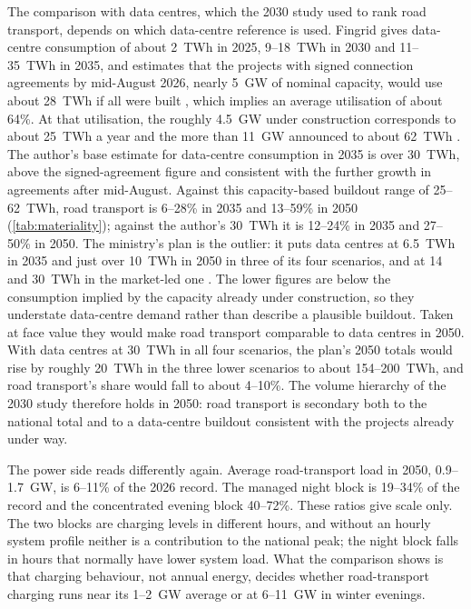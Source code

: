 \documentclass[11pt,a4paper]{article}
\begin{document}
The comparison with data centres, which the 2030 study used to rank road transport, depends on which data-centre reference is used. Fingrid gives data-centre consumption of about 2~TWh in 2025, 9--18~TWh in 2030 and 11--35~TWh in 2035, and estimates that the projects with signed connection agreements by mid-August 2026, nearly 5~GW of nominal capacity, would use about 28~TWh if all were built \citep{fingrid2026prospects}, which implies an average utilisation of about 64\%. At that utilisation, the roughly 4.5~GW under construction corresponds to about 25~TWh a year and the more than 11~GW announced to about 62~TWh \citep{merilehto2026blog}. The author's base estimate for data-centre consumption in 2035 is over 30~TWh, above the signed-agreement figure and consistent with the further growth in agreements after mid-August. Against this capacity-based buildout range of 25--62~TWh, road transport is 6--28\% in 2035 and 13--59\% in 2050 (\cref{tab:materiality}); against the author's 30~TWh it is 12--24\% in 2035 and 27--50\% in 2050. The ministry's plan is the outlier: it puts data centres at 6.5~TWh in 2035 and just over 10~TWh in 2050 in three of its four scenarios, and at 14 and 30~TWh in the market-led one \citep{meae2026ltcp}. The lower figures are below the consumption implied by the capacity already under construction, so they understate data-centre demand rather than describe a plausible buildout. Taken at face value they would make road transport comparable to data centres in 2050. With data centres at 30~TWh in all four scenarios, the plan's 2050 totals would rise by roughly 20~TWh in the three lower scenarios to about 154--200~TWh, and road transport's share would fall to about 4--10\%. The volume hierarchy of the 2030 study therefore holds in 2050: road transport is secondary both to the national total and to a data-centre buildout consistent with the projects already under way.

The power side reads differently again. Average road-transport load in 2050, 0.9--1.7~GW, is 6--11\% of the 2026 record. The managed night block is 19--34\% of the record and the concentrated evening block 40--72\%. These ratios give scale only. The two blocks are charging levels in different hours, and without an hourly system profile neither is a contribution to the national peak; the night block falls in hours that normally have lower system load. What the comparison shows is that charging behaviour, not annual energy, decides whether road-transport charging runs near its 1--2~GW average or at 6--11~GW in winter evenings.
\end{document}
